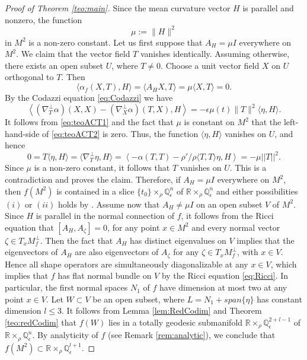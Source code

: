 \documentclass[11pt,a4paper]{article}
\numberwithin{equation}{section}
\newcommand{\R}{\mathbb{R}}
\newcommand{\Q}{\mathbb{Q}}
\newcommand{\e}{\epsilon}
\newcommand{\WP}{\R\times_{\rho}\Q^n_{\epsilon}}
\newcommand{\pl}{\langle}
\newcommand{\pr}{\rangle}
\begin{document}
\begin{proof}[Proof of Theorem \ref{teo:main}]
Since the mean curvature vector $H$ is parallel and nonzero, the function
\[
\mu:=\|H\|^2
\]
in $M^2$ is a non-zero constant. Let us first suppose that $A_{H}=\mu I$ everywhere on $M^2$. We claim that the vector field $T$ vanishes identically. Assuming otherwise, there exists an open subset $U$, where $T\neq0$. Choose a unit vector field $X$ on $U$ orthogonal to $T$. Then
\begin{equation} \label{eq:teoACT1}
\pl\alpha_f(X,T),H\pr = \langle A_{H} X,T\rangle 
= \mu\langle X,T\rangle=0. 
\end{equation}
By the Codazzi equation \eqref{eq:Codazzi} we have 
\begin{equation} \label{eq:teoACT2}
\left\pl(\nabla^{\perp}_{T} \alpha)(X,X)- (\nabla^{\perp}_{X} \alpha)(T,X),H\right\pr = -\e\mu(t)\|T\|^2\pl\eta,H\pr.
\end{equation}
It follows from \eqref{eq:teoACT1} and the fact that $\mu$ is constant on $M^2$ that the left-hand-side of \eqref{eq:teoACT2} is zero. Thus, the function $\pl\eta,H\pr$ vanishes on $U$, and hence
\[
0 = T\langle \eta, H\rangle = \langle \nabla_{T}^{\perp} \eta, H\rangle = \left\pl-\alpha(T,T)-\rho'/\rho\langle T, T\rangle \eta,H\right\pr = -\mu \vert \vert T\vert \vert^2.
\]
Since $\mu$ is a non-zero constant, it follows that $T$ vanishes on $U$. This is a contradiction and proves the claim. Therefore, if $A_H=\mu I$ everywhere on $M^2$, then $f(M^2)$ is contained in a slice $\{t_0\}\times_{\rho}\Q^n_\e$ of  $\WP$ and either possibilities $(i)$ or $(ii)$ holds by \cite[Theorem 4]{Yau}. Assume now that $A_{H}\neq \mu I$ on an open subset $V$ of $M^2$. Since $H$ is parallel in the normal connection of $f$, it follows from the Ricci equation that $[A_H,A_\zeta]=0$, for any point $x\in M^2$ and every normal vector $\zeta\in T_xM^\perp_f$. Then the fact that $A_H$ has distinct eigenvalues on $V$ implies that the eigenvectors of $A_H$ are also eigenvectors of $A_\zeta$ for any $\zeta\in T_xM_f^\perp$, with $x\in V$. Hence all shape operators are simultaneously diagonalizable at any $x\in V$, which implies that $f$ has flat normal bundle on $V$ by the Ricci equation \eqref{eq:Ricci}. In particular, the first normal spaces $N_1$ of $f$ have dimension at most two at any point $x\in V$. Let $W\subset V$ be an open subset, where $L=N_1+span\{\eta\}$ has constant dimension $l\leq3$. It follows from Lemma \ref{lem:RedCodim} and Theorem \ref{teo:redCodim} that $f(W)$ lies in a totally geodesic submanifold $\R\times_{\rho}\Q^{2+l- 1}_{\epsilon}$ of $\R\times_{\rho}\Q^{n}_{\epsilon}$. By analyticity of $f$ (see Remark \ref{rem:analytic}), we conclude that $f(M^2)\subset\R\times_{\rho}\Q^{l+1}_\e$.
\end{proof}
\end{document}
